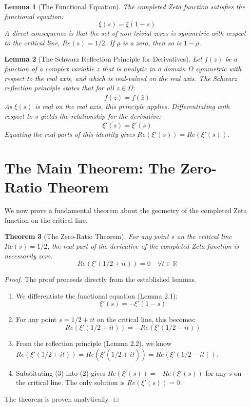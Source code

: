 \documentclass{article}
\newtheorem{theorem}{Theorem}[section]
\newtheorem{lemma}[theorem]{Lemma}
\begin{document}
\begin{lemma}[The Functional Equation]
The completed Zeta function satisfies the functional equation:
$$ \xi(s) = \xi(1-s) $$
A direct consequence is that the set of non-trivial zeros is symmetric with respect to the critical line, $Re(s)=1/2$. If $\rho$ is a zero, then so is $1-\rho$.
\end{lemma}

\begin{lemma}[The Schwarz Reflection Principle for Derivatives]
Let $f(z)$ be a function of a complex variable $z$ that is analytic in a domain $\Omega$ symmetric with respect to the real axis, and which is real-valued on the real axis. The Schwarz reflection principle states that for all $z \in \Omega$:
$$ \overline{f(z)} = f(\bar{z}) $$
As $\xi(s)$ is real on the real axis, this principle applies. Differentiating with respect to $s$ yields the relationship for the derivative:
$$ \overline{\xi'(s)} = \xi'(\bar{s}) $$
Equating the real parts of this identity gives $Re(\xi'(s)) = Re(\xi'(\bar{s}))$.
\end{lemma}

\section{The Main Theorem: The Zero-Ratio Theorem}
We now prove a fundamental theorem about the geometry of the completed Zeta function on the critical line.

\begin{theorem}[The Zero-Ratio Theorem]
For any point $s$ on the critical line $Re(s)=1/2$, the real part of the derivative of the completed Zeta function is necessarily zero.
$$ Re(\xi'(1/2 + it)) = 0 \quad \forall t \in \mathbb{R} $$
\end{theorem}

\begin{proof}
The proof proceeds directly from the established lemmas.
\begin{enumerate}
    \item We differentiate the functional equation (Lemma 2.1):
    $$ \xi'(s) = -\xi'(1-s) $$
    \item For any point $s = 1/2 + it$ on the critical line, this becomes:
    $$ Re(\xi'(1/2 + it)) = -Re(\xi'(1/2 - it)) $$
    \item From the reflection principle (Lemma 2.2), we know $Re(\xi'(1/2+it)) = Re(\xi'(\overline{1/2+it})) = Re(\xi'(1/2-it))$.
    \item Substituting (3) into (2) gives $Re(\xi'(s)) = -Re(\xi'(s))$ for any $s$ on the critical line. The only solution is $Re(\xi'(s)) = 0$.
\end{enumerate}
The theorem is proven analytically.
\end{proof}
\end{document}
